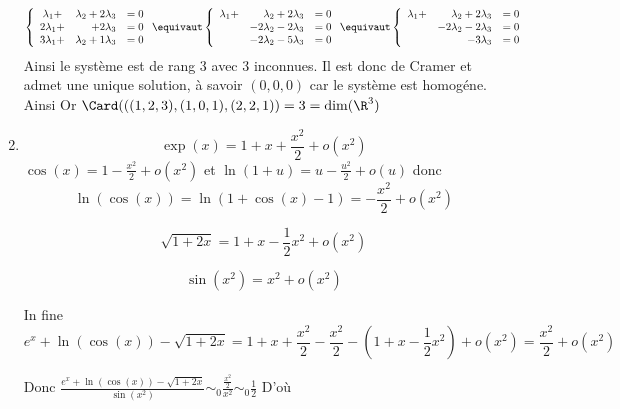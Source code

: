 \documentclass[a4paper, 11pt,reqno]{article}
\begin{document}
\begin{correction}
\begin{enumerate}
$$ \left\{ \begin{array}{crc}
\lambda_1 + &\lambda_2+ 2\lambda_3 &=0\\
2\lambda_1 + & + 2\lambda_3 &=0\\
3\lambda_1 + &\lambda_2 + 1\lambda_3 &=0\\
\end{array}\right. \equivaut 
\left\{ \begin{array}{crc}
\lambda_1 + &\lambda_2+ 2\lambda_3 &=0\\
 &-2\lambda_2  -2\lambda_3 &=0\\
&-2\lambda_2 -5\lambda_3 &=0\\
\end{array}\right. 
\equivaut 
\left\{ \begin{array}{crc}
\lambda_1 + &\lambda_2+ 2\lambda_3 &=0\\
 &-2\lambda_2  -2\lambda_3 &=0\\
& -3\lambda_3 &=0\\
\end{array}\right. 
$$
Ainsi le système est de rang 3 avec 3 inconnues. Il est donc de Cramer et admet une unique solution, à savoir $(0,0,0)$ car le système est homogéne. 
Ainsi 
Or 
$\Card(((1,2,3),(1,0,1), (2,2,1)) = 3 =\dim(\R^3)$


\item $$\exp(x) = 1+x+\frac{x^2}{2} +o(x^2)$$
$\cos(x) = 1-\frac{x^2}{2} +o(x^2)$ et $\ln(1+u) = u -\frac{u^2}{2} +o(u)$
donc $$\ln(\cos(x)) = \ln(1+\cos(x)-1)= -\frac{x^2}{2} +o(x^2)$$

$$\sqrt{1+2x} = 1+x -\frac{1}{2}x^2+o(x^2)$$


$$\sin(x^2)= x^2 +o(x^2)$$

In fine $$e^x+\ln(\cos(x))-\sqrt{1+2x} =  1+x+\frac{x^2}{2}    -\frac{x^2}{2} -(1+x -\frac{1}{2}x^2)+o(x^2) = \frac{x^2}{2} +o(x^2)$$

Donc $ \frac{e^x+\ln(\cos(x))-\sqrt{1+2x}}{\sin(x^2)} \sim_0 \frac{ \frac{x^2}{2} }{x^2 }\sim_0 \frac{1}{2}$
D'où 

\end{enumerate}
\end{correction}
\end{document}
